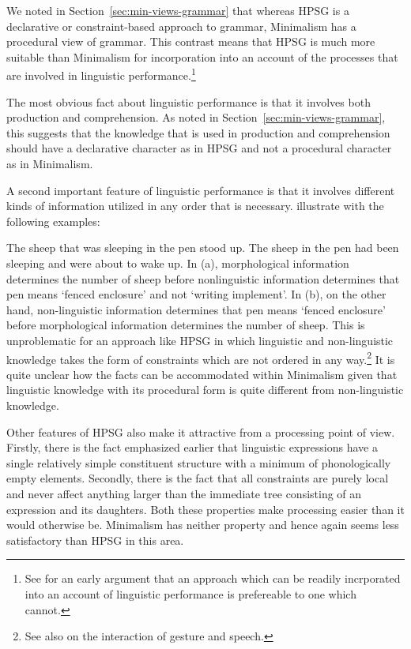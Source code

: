\documentclass[output=paper
                ,modfonts
                ,nonflat
	        ,collection
	        ,collectionchapter
	        ,collectiontoclongg
 	        ,biblatex
                ,babelshorthands
                ,newtxmath
                ,draftmode
                ,colorlinks, citecolor=brown
]{./langsci/langscibook}
\begin{document}
We noted in Section~\ref{sec:min-views-grammar} that whereas HPSG is a declarative or
constraint-based approach to grammar, Minimalism has a procedural view of grammar. This contrast
means that HPSG is much more suitable than Minimalism for incorporation into an account of the
processes that are involved in linguistic performance.\footnote{
  See \citet{BK82a} for an early argument that an approach which can be readily incrporated into an account of linguistic performance is prefereable to one which cannot.
}

The most obvious fact about linguistic performance is that it involves both production and
comprehension. As noted in Section~\ref{sec:min-views-grammar}, this suggests that the knowledge
that is used in production and comprehension should have a declarative character as in HPSG and not
a procedural character as in Minimalism.

A second important feature of linguistic performance is
that it involves different kinds of information utilized in any order that is
necessary. \citet[--368]{SW2011a} illustrate with the following examples:

\eal
\label{ex-sheep-pen-processing}
\ex 	The sheep that was sleeping in the pen stood up.
\ex	The sheep in the pen had been sleeping and were about to wake up.
\zl
%
In (a), morphological information determines the number of sheep before nonlinguistic
information determines that pen means ‘fenced enclosure’ and not ‘writing implement’. In (b), on
the other hand, non-linguistic information determines that pen means ‘fenced enclosure’ before
morphological information determines the number of sheep. This is unproblematic for an approach like
HPSG in which linguistic and non-linguistic knowledge takes the form of constraints which are not
ordered in any way.\footnote{%
  See also  on the interaction of gesture and speech.
}
It is quite unclear how the facts can be accommodated within Minimalism given
that linguistic knowledge with its procedural form is quite different from non-linguistic knowledge.

Other features of HPSG also make it attractive from a processing point of view. Firstly, there is
the fact emphasized earlier that linguistic expressions have a single relatively simple constituent
structure with a minimum of phonologically empty elements. Secondly, there is the fact that all
constraints are purely local and never affect anything larger than the immediate tree consisting of an
expression and its daughters. Both these properties make processing easier than it would otherwise
be. Minimalism has neither property and hence again seems less satisfactory than HPSG in this area.
\end{document}
